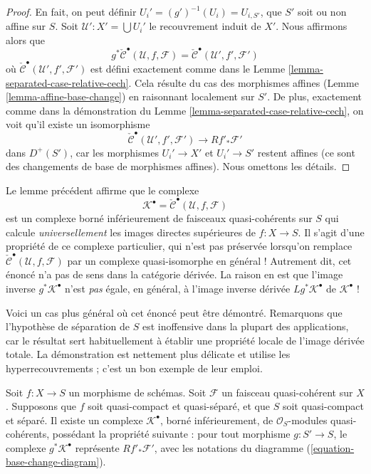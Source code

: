 \begin{proof}
En fait, on peut définir $U_i' = (g')^{-1}(U_i) = U_{i, S'}$, que $S'$ soit
ou non affine sur $S$. Soit $\mathcal{U}' : X' = \bigcup U_i'$ le recouvrement
induit de $X'$. Nous affirmons alors que
$$
g^*\check{\mathcal{C}}^\bullet(\mathcal{U}, f, \mathcal{F})
=
\check{\mathcal{C}}^\bullet(\mathcal{U}', f', \mathcal{F}')
$$
où $\check{\mathcal{C}}^\bullet(\mathcal{U}', f', \mathcal{F}')$ est défini
exactement comme dans le Lemme \ref{lemma-separated-case-relative-cech}.
Cela résulte du cas des morphismes affines (Lemme
\ref{lemma-affine-base-change}) en raisonnant localement sur $S'$. De plus,
exactement comme dans la démonstration du Lemme
\ref{lemma-separated-case-relative-cech}, on voit qu'il existe un isomorphisme
$$
\check{\mathcal{C}}^\bullet(\mathcal{U}', f', \mathcal{F}')
\longrightarrow
Rf'_*\mathcal{F}'
$$
dans $D^{+}(S')$, car les morphismes $U_i' \to X'$ et $U_i' \to S'$ restent
affines (ce sont des changements de base de morphismes affines). Nous omettons
les détails.
\end{proof}

\noindent
Le lemme précédent affirme que le complexe
$$
\mathcal{K}^\bullet = \check{\mathcal{C}}^\bullet(\mathcal{U}, f, \mathcal{F})
$$
est un complexe borné inférieurement de faisceaux quasi-cohérents sur $S$ qui
calcule {\it universellement} les images directes supérieures de
$f : X \to S$. Il s'agit d'une propriété de ce complexe particulier, qui
n'est pas préservée lorsqu'on remplace
$\check{\mathcal{C}}^\bullet(\mathcal{U}, f, \mathcal{F})$
par un complexe quasi-isomorphe en général ! Autrement dit, cet énoncé n'a pas
de sens dans la catégorie dérivée. La raison en est que l'image inverse
$g^*\mathcal{K}^\bullet$ n'est {\it pas} égale, en général, à l'image inverse
dérivée $Lg^*\mathcal{K}^\bullet$ de $\mathcal{K}^\bullet$ !

\medskip\noindent
Voici un cas plus général où cet énoncé peut être démontré. Remarquons que
l'hypothèse de séparation de $S$ est inoffensive dans la plupart des
applications, car le résultat sert habituellement à établir une propriété
locale de l'image dérivée totale. La démonstration est nettement plus délicate
et utilise les hyperrecouvrements ; c'est un bon exemple de leur emploi.

\begin{lemma}
\label{lemma-hypercoverings}
Soit $f : X \to S$ un morphisme de schémas. Soit $\mathcal{F}$ un faisceau
quasi-cohérent sur $X$. Supposons que $f$ soit quasi-compact et quasi-séparé,
et que $S$ soit quasi-compact et séparé. Il existe un complexe
$\mathcal{K}^\bullet$, borné inférieurement, de $\mathcal{O}_S$-modules
quasi-cohérents, possédant la propriété suivante : pour tout morphisme
$g : S' \to S$, le complexe $g^*\mathcal{K}^\bullet$ représente
$Rf'_*\mathcal{F}'$, avec les notations du diagramme
(\ref{equation-base-change-diagram}).
\end{lemma}

